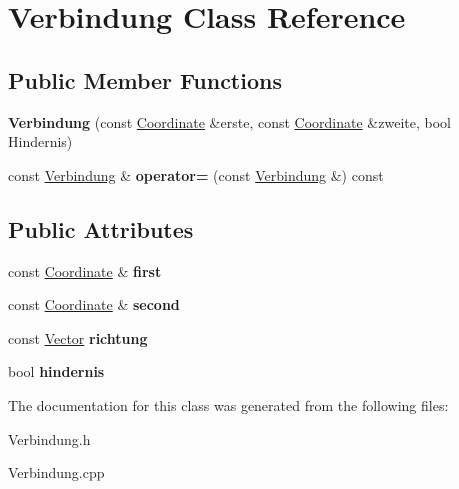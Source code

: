 \hypertarget{class_verbindung}{\section{Verbindung Class Reference}
\label{class_verbindung}
}
\subsection*{Public Member Functions}
\begin{DoxyCompactItemize}
\item 
\hypertarget{class_verbindung_a1daa504a0c8a9b09667426d2eb79ff1c}{{\bfseries Verbindung} (const \hyperlink{class_coordinate}{Coordinate} \&erste, const \hyperlink{class_coordinate}{Coordinate} \&zweite, bool Hindernis)}\label{class_verbindung_a1daa504a0c8a9b09667426d2eb79ff1c}

\item 
\hypertarget{class_verbindung_a75c826febffaeb8e1a1e4fca6622620f}{const \hyperlink{class_verbindung}{Verbindung} \& {\bfseries operator=} (const \hyperlink{class_verbindung}{Verbindung} \&) const }\label{class_verbindung_a75c826febffaeb8e1a1e4fca6622620f}

\end{DoxyCompactItemize}
\subsection*{Public Attributes}
\begin{DoxyCompactItemize}
\item 
\hypertarget{class_verbindung_a6754cb8101160c165f1910581cf924bc}{const \hyperlink{class_coordinate}{Coordinate} \& {\bfseries first}}\label{class_verbindung_a6754cb8101160c165f1910581cf924bc}

\item 
\hypertarget{class_verbindung_a7fd47daefa46c0329003441cc877eb2d}{const \hyperlink{class_coordinate}{Coordinate} \& {\bfseries second}}\label{class_verbindung_a7fd47daefa46c0329003441cc877eb2d}

\item 
\hypertarget{class_verbindung_a28b2efafed8248ecfc41d5097046784b}{const \hyperlink{class_vector}{Vector} {\bfseries richtung}}\label{class_verbindung_a28b2efafed8248ecfc41d5097046784b}

\item 
\hypertarget{class_verbindung_abcf800621e1099ee1c70aef06f43a663}{bool {\bfseries hindernis}}\label{class_verbindung_abcf800621e1099ee1c70aef06f43a663}

\end{DoxyCompactItemize}


The documentation for this class was generated from the following files\-:\begin{DoxyCompactItemize}
\item 
Verbindung.\-h\item 
Verbindung.\-cpp\end{DoxyCompactItemize}
